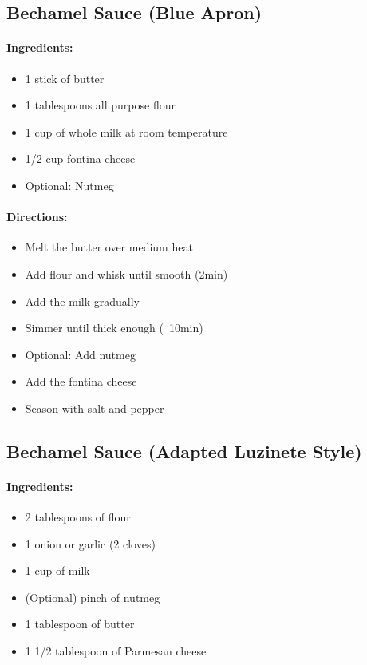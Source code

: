 \documentclass{article}
\begin{document}
\subsection{Bechamel Sauce (Blue Apron)}

\paragraph{Ingredients:}

\begin{itemize}
\item 1 stick of butter
\item 1 tablespoons all purpose flour
\item 1 cup of whole milk at room temperature
\item 1/2 cup fontina cheese
\item Optional: Nutmeg
\end{itemize}

\paragraph{Directions:}
\begin{itemize}
\item Melt the butter over medium heat
\item Add flour and whisk until smooth (2min)
\item Add the milk gradually
\item Simmer until thick enough (~10min)
\item Optional: Add nutmeg
\item Add the fontina cheese
\item Season with salt and pepper
\end{itemize}

\subsection{Bechamel Sauce (Adapted Luzinete Style)}

\paragraph{Ingredients:}

\begin{itemize}
	\item 2 tablespoons of flour
	\item 1 onion or garlic (2 cloves)
	\item 1 cup of milk
	\item (Optional) pinch of nutmeg
	\item 1 tablespoon of butter
	\item 1 1/2 tablespoon of Parmesan cheese
\end{itemize}
\end{document}
